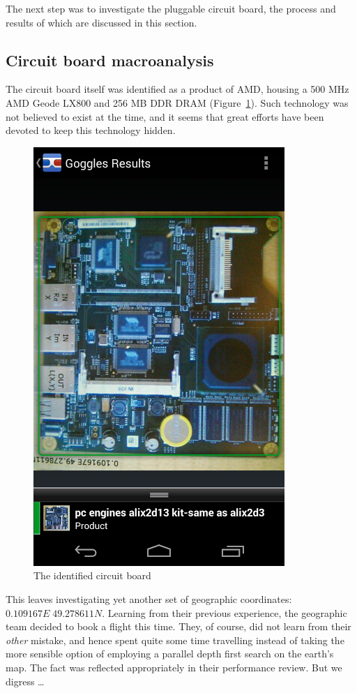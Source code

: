 The next step was to investigate the pluggable circuit board, the process and results of which are discussed in this section.

\subsection{Circuit board macroanalysis}
The circuit board itself was identified as a product of AMD, housing a 500 MHz AMD Geode LX800 and 256 MB DDR DRAM (Figure~\ref{fig:circuit-board}). Such technology was not believed to exist at the time, and it seems that great efforts have been devoted to keep this technology hidden.


\begin{figure}[h]
	\centering
	\includegraphics[width=0.8\columnwidth]{img/circuit-board.png}
	\caption{The identified circuit board}
	\label{fig:circuit-board}
\end{figure}

This leaves investigating yet another set of geographic coordinates: $0.109167E \; 49.278611N$. Learning from their previous experience, the geographic team decided to book a flight this time. They, of course, did not learn from their \emph{other} mistake, and hence spent quite some time travelling instead of taking the more sensible option of employing a parallel depth first search on the earth's map. The fact was reflected appropriately in their performance review. But we digress \ldots

